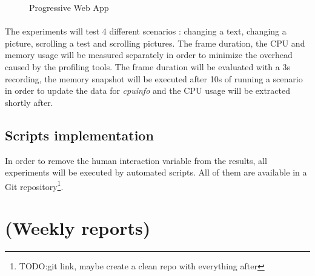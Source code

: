 \documentclass{kththesis}
\begin{document}
\begin{figure}
    \hfill
    \caption{Progressive Web App}
    \label{fig:pwa_screens}
\end{figure}

\paragraph{}
The experiments will test 4 different scenarios : changing a text, changing a picture, scrolling a test and scrolling pictures. The frame duration, the CPU and memory usage will be measured separately in order to minimize the overhead caused by the profiling tools. \newline
The frame duration will be evaluated with a 3s recording, the memory snapshot will be executed after 10s of running a scenario in order to update the data for \textit{cpuinfo} and the CPU usage will be extracted shortly after.


    \subsection{Scripts implementation}

In order to remove the human interaction variable from the results, all experiments will be executed by automated scripts. All of them are available in a Git repository\footnote{TODO:git link, maybe create a clean repo with everything after}.


\paragraph{}





\iffalse
\section{(Weekly reports)}
\end{document}
